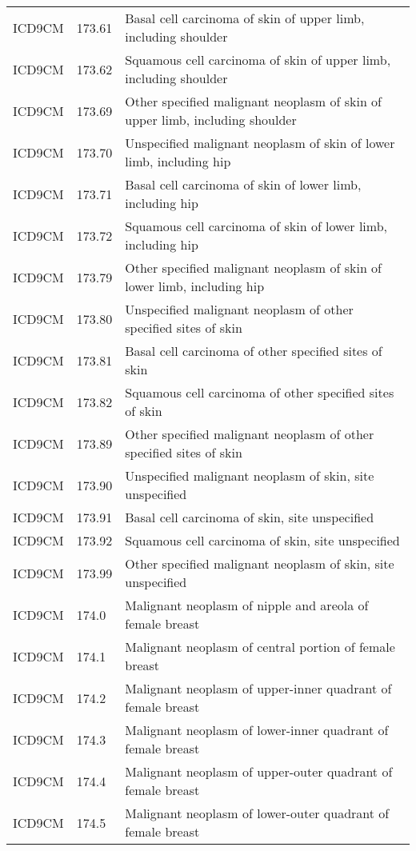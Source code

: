 \begin{longtable}{p{}p{}p{}}
  ICD9CM & 173.61 & Basal cell carcinoma of skin of upper limb, including shoulder \\ 
  ICD9CM & 173.62 & Squamous cell carcinoma of skin of upper limb, including shoulder \\ 
  ICD9CM & 173.69 & Other specified malignant neoplasm of skin of upper limb, including shoulder \\ 
  ICD9CM & 173.70 & Unspecified malignant neoplasm of skin of lower limb, including hip \\ 
  ICD9CM & 173.71 & Basal cell carcinoma of skin of lower limb, including hip \\ 
  ICD9CM & 173.72 & Squamous cell carcinoma of skin of lower limb, including hip \\ 
  ICD9CM & 173.79 & Other specified malignant neoplasm of skin of lower limb, including hip \\ 
  ICD9CM & 173.80 & Unspecified malignant neoplasm of other specified sites of skin \\ 
  ICD9CM & 173.81 & Basal cell carcinoma of other specified sites of skin \\ 
  ICD9CM & 173.82 & Squamous cell carcinoma of other specified sites of skin \\ 
  ICD9CM & 173.89 & Other specified malignant neoplasm of other specified sites of skin \\ 
  ICD9CM & 173.90 & Unspecified malignant neoplasm of skin, site unspecified \\ 
  ICD9CM & 173.91 & Basal cell carcinoma of skin, site unspecified \\ 
  ICD9CM & 173.92 & Squamous cell carcinoma of skin, site unspecified \\ 
  ICD9CM & 173.99 & Other specified malignant neoplasm of skin, site unspecified \\ 
  ICD9CM & 174.0 & Malignant neoplasm of nipple and areola of female breast \\ 
  ICD9CM & 174.1 & Malignant neoplasm of central portion of female breast \\ 
  ICD9CM & 174.2 & Malignant neoplasm of upper-inner quadrant of female breast \\ 
  ICD9CM & 174.3 & Malignant neoplasm of lower-inner quadrant of female breast \\ 
  ICD9CM & 174.4 & Malignant neoplasm of upper-outer quadrant of female breast \\ 
  ICD9CM & 174.5 & Malignant neoplasm of lower-outer quadrant of female breast \\ 

\end{longtable}
